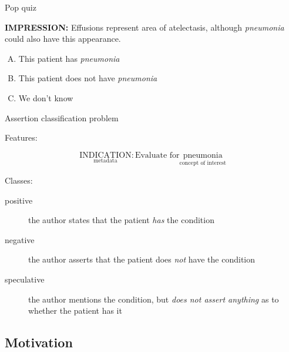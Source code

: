 \documentclass[pdf]{beamer}
\newcommand{\?}{\ensuremath{^\texttt{\bf [CITATION~NEEDED]}}}
\begin{document}
\begin{frame}{Pop quiz}
\begin{center}
\textbf{IMPRESSION:} Effusions represent area of atelectasis, although \emph{pneumonia} could	also have this appearance.
\end{center}

\begin{enumerate}[A.]
\item This patient has \emph{pneumonia}
\item This patient does not have \emph{pneumonia}
\item \alert<2>{We don't know}
\end{enumerate}

\end{frame}

\begin{frame}{Assertion classification problem}

Features:

\begin{equation}
\underset{\text{metadata}}{\text{INDICATION}}: \text{Evaluate for} \underset{\text{concept of interest}}{\text{pneumonia}}
\end{equation}

\pause

Classes:

\begin{description}
\item[positive] the author states that the patient \emph{has} the condition
\item[negative] the author asserts that the patient does \emph{not} have the condition
\item[speculative] the author mentions the condition, but \emph{does not assert anything} as to whether the patient has it
\end{description}

\end{frame}

\subsection{Motivation}
\end{document}
